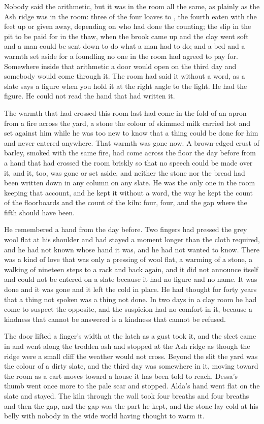 \scenebreak

Nobody said the arithmetic, but it was in the room all the same, as plainly as the Ash ridge was in the room: three of the four loaves to , the fourth eaten with the feet up or given away, depending on who had done the counting; the slip in the pit to be paid for in the thaw, when the brook came up and the clay went soft and a man could be sent down to do what a man had to do; and a bed and a warmth set aside for a foundling no one in the room had agreed to pay for. Somewhere inside that arithmetic a door would open on the third day and somebody would come through it. The room had said it without a word, as a slate says a figure when you hold it at the right angle to the light. He had the figure. He could not read the hand that had written it.

The warmth that had crossed this room last had come in the fold of an apron from a fire across the yard, a stone the colour of skimmed milk carried hot and set against him while he was too new to know that a thing could be done for him and never entered anywhere. That warmth was gone now. A brown-edged crust of barley, smoked with the same fire, had come across the floor the day before from a hand that had crossed the room briskly so that no speech could be made over it, and it, too, was gone or set aside, and neither the stone nor the bread had been written down in any column on any slate. He was the only one in the room keeping that account, and he kept it without a word, the way he kept the count of the floorboards and the count of the kiln: four, four, and the gap where the fifth should have been.

He remembered a hand from the day before. Two fingers had pressed the grey wool flat at his shoulder and had stayed a moment longer than the cloth required, and he had not known whose hand it was, and he had not wanted to know. There was a kind of love that was only a pressing of wool flat, a warming of a stone, a walking of nineteen steps to a rack and back again, and it did not announce itself and could not be entered on a slate because it had no figure and no name. It was done and it was gone and it left the cold in place. He had thought for forty years that a thing not spoken was a thing not done. In two days in a clay room he had come to suspect the opposite, and the suspicion had no comfort in it, because a kindness that cannot be answered is a kindness that cannot be refused.

The door lifted a finger's width at the latch as a gust took it, and the sleet came in and went along the trodden ash and stopped at the Ash ridge as though the ridge were a small cliff the weather would not cross. Beyond the slit the yard was the colour of a dirty slate, and the third day was somewhere in it, moving toward the room as a cart moves toward a house it has been told to reach. Dessa's thumb went once more to the pale scar and stopped. Alda's hand went flat on the slate and stayed. The kiln through the wall took four breaths and four breaths and then the gap, and the gap was the part he kept, and the stone lay cold at his belly with nobody in the wide world having thought to warm it.
